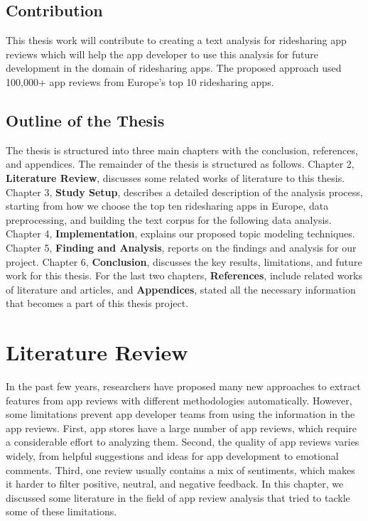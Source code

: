 \documentclass[12pt]{article}
\begin{document}
\subsection{Contribution}
This thesis work will contribute to creating a text analysis for ridesharing app reviews which will help the app developer to use this analysis for future development in the domain of ridesharing apps. The proposed approach used 100,000+ app reviews from Europe's top 10 ridesharing apps.


\subsection{Outline of the Thesis}
The thesis is structured into three main chapters with the conclusion, references, and appendices. The remainder of the thesis is structured as follows. Chapter 2, \textbf{Literature Review}, discusses some related works of literature to this thesis. Chapter 3, \textbf{Study Setup}, describes a detailed description of the analysis process, starting from how we choose the top ten ridesharing apps in Europe, data preprocessing, and building the text corpus for the following data analysis. Chapter 4, \textbf{Implementation}, explains our proposed topic modeling techniques. Chapter 5, \textbf{Finding and Analysis}, reports on the findings and analysis for our project. Chapter 6, \textbf{Conclusion}, discusses the key results, limitations, and future work for this thesis. For the last two chapters, \textbf{References}, include related works of literature and articles, and \textbf{Appendices}, stated all the necessary information that becomes a part of this thesis project.



\newpage
\section{Literature Review} 
In the past few years, researchers have proposed many new approaches to extract features from app reviews with different methodologies automatically. However, some limitations prevent app developer teams from using the information in the app reviews. First, app stores have a large number of app reviews, which require a considerable effort to analyzing them. Second, the quality of app reviews varies widely, from helpful suggestions and ideas for app development to emotional comments. Third, one review usually contains a mix of sentiments, which makes it harder to filter positive, neutral, and negative feedback. In this chapter, we discussed some literature in the field of app review analysis that tried to tackle some of these limitations.
\end{document}
